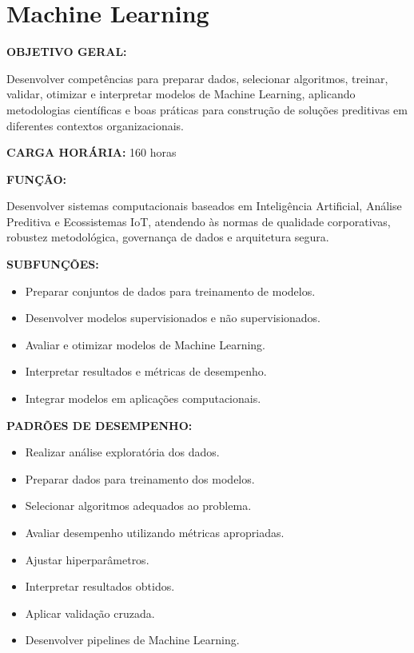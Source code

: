 \section{Machine Learning}

\textbf{OBJETIVO GERAL:}

Desenvolver competências para preparar dados, selecionar algoritmos, treinar, validar, otimizar e interpretar modelos de Machine Learning, aplicando metodologias científicas e boas práticas para construção de soluções preditivas em diferentes contextos organizacionais.

\textbf{CARGA HORÁRIA:} 160 horas

\textbf{FUNÇÃO:}

Desenvolver sistemas computacionais baseados em Inteligência Artificial, Análise Preditiva e Ecossistemas IoT, atendendo às normas de qualidade corporativas, robustez metodológica, governança de dados e arquitetura segura.

\textbf{SUBFUNÇÕES:}

\begin{itemize}
\item Preparar conjuntos de dados para treinamento de modelos.
\item Desenvolver modelos supervisionados e não supervisionados.
\item Avaliar e otimizar modelos de Machine Learning.
\item Interpretar resultados e métricas de desempenho.
\item Integrar modelos em aplicações computacionais.
\end{itemize}

\textbf{PADRÕES DE DESEMPENHO:}

\begin{itemize}
\item Realizar análise exploratória dos dados.
\item Preparar dados para treinamento dos modelos.
\item Selecionar algoritmos adequados ao problema.
\item Avaliar desempenho utilizando métricas apropriadas.
\item Ajustar hiperparâmetros.
\item Interpretar resultados obtidos.
\item Aplicar validação cruzada.
\item Desenvolver pipelines de Machine Learning.
\end{itemize}

